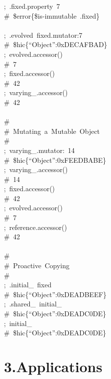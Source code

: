 \documentclass[preprint]{{sigplanconf}}
\begin{document}
\begin{mdpre}
;~.fixed.property~7\\
{\#~\$error\{\$is-immutable~.fixed\}}\\
\\
;~.evolved~fixed.mutator{:7}\\
{\#~\$hic\{“Object”:0xDECAFBAD\}}\\
;~evolved.accessor()\\
{\#~7}\\
;~fixed.accessor()\\
{\#~42}\\
;~varying\_.accessor()\\
{\#~42}\\
\\
{\#}\\
{\#~Mutating~a~Mutable~Object}\\
{\#}\\
;~varying\_.mutator{:}~{14}\\
{\#~\$hic\{“Object”:0xFEEDBABE\}}\\
;~varying\_.accessor()\\
{\#~14}\\
;~fixed.accessor()\\
{\#~42}\\
;~evolved.accessor()\\
{\#~7}\\
;~reference.accessor()\\
{\#~42}\\
\\
{\#}\\
{\#~Proactive~Copying}\\
{\#}\\
;~.initial\_~fixed\\
{\#~\$hic\{“Object”:0xDEADBEEF\}}\\
;~.shared\_~initial\_\\
{\#~\$hic\{“Object”:0xDEADC0DE\}}\\
;~initial\_\\
{\#~\$hic\{“Object”:0xDEADC0DE\}}\\
\end{mdpre}
\section{3.\hspace*{0.5em}Applications}\label{sec-applications}%
\end{document}
